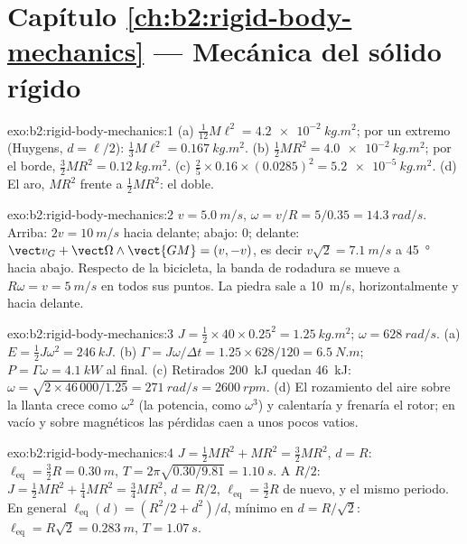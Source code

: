 \section*{Capítulo \ref{ch:b2:rigid-body-mechanics} --- Mecánica del sólido rígido}

\begin{solution}{exo:b2:rigid-body-mechanics:1}
(a) $\tfrac1{12}M\ell^2 = \qty{4.2e-2}{kg.m^2}$; por un extremo (Huygens,
$d = \ell/2$): $\tfrac13M\ell^2 = \qty{0.167}{kg.m^2}$. (b) $\tfrac12MR^2 =
\qty{4.0e-2}{kg.m^2}$; por el borde, $\tfrac32MR^2 = \qty{0.12}{kg.m^2}$.
(c) $\tfrac25 \times 0.16 \times (0.0285)^2 = \qty{5.2e-5}{kg.m^2}$. (d) El
aro, $MR^2$ frente a $\tfrac12MR^2$: el doble.
\end{solution}

\begin{solution}{exo:b2:rigid-body-mechanics:2}
$v = \qty{5.0}{m/s}$, $\omega = v/R = 5/0.35 = \qty{14.3}{rad/s}$. Arriba:
$2v = \qty{10}{m/s}$ hacia delante; abajo: $0$; delante: $\vect v_G + \vect\Omega
\wedge\vect{GM} = (v, -v)$, es decir $v\sqrt2 = \qty{7.1}{m/s}$ a
\qty{45}{\degree} hacia abajo. Respecto de la bicicleta, la banda de
rodadura se mueve a $R\omega = v = \qty{5}{m/s}$ en todos sus puntos. La
piedra sale a \qty{10}{m/s}, horizontalmente y hacia delante.
\end{solution}

\begin{solution}{exo:b2:rigid-body-mechanics:3}
$J = \tfrac12 \times 40 \times 0.25^2 = \qty{1.25}{kg.m^2}$; $\omega = \qty{628}{rad/s}$.
(a) $E = \tfrac12J\omega^2 = \qty{246}{kJ}$. (b) $\Gamma = J\omega/\Delta t =
1.25 \times 628/120 = \qty{6.5}{N.m}$; $P = \Gamma\omega = \qty{4.1}{kW}$ al final.
(c) Retirados \qty{200}{kJ} quedan \qty{46}{kJ}: $\omega = \sqrt{2 \times 46\,000/1.25}
= \qty{271}{rad/s} = \qty{2600}{rpm}$. (d) El rozamiento del aire sobre la
llanta crece como $\omega^2$ (la potencia, como $\omega^3$) y calentaría y
frenaría el rotor; en vacío y sobre  magnéticos las pérdidas caen
a unos pocos vatios.
\end{solution}

\begin{solution}{exo:b2:rigid-body-mechanics:4}
$J = \tfrac12MR^2 + MR^2 = \tfrac32MR^2$, $d = R$: $\ell_{\text{eq}} = \tfrac32R
= \qty{0.30}{m}$, $T = 2\pi\sqrt{0.30/9.81} = \qty{1.10}{s}$. A $R/2$: $J =
\tfrac12MR^2 + \tfrac14MR^2 = \tfrac34MR^2$, $d = R/2$, $\ell_{\text{eq}} =
\tfrac32R$ de nuevo, y el mismo periodo. En general $\ell_{\text{eq}}(d) = (R^2/2 +
d^2)/d$, mínimo en $d = R/\sqrt2$: $\ell_{\text{eq}} = R\sqrt2 = \qty{0.283}{m}$,
$T = \qty{1.07}{s}$.
\end{solution}


